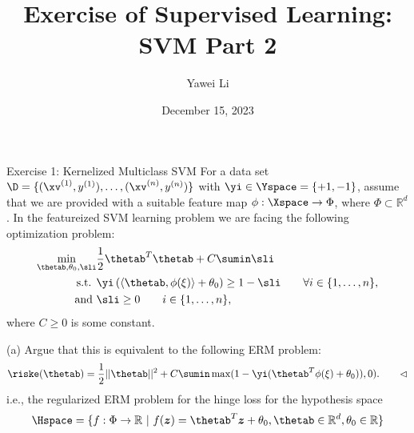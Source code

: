 \documentclass[aspectratio=169]{beamer}
\title[]{\textbf{Exercise of Supervised Learning: \\ SVM Part 2}}
\author{Yawei Li}
\institute[LMU]
{
\\
  \texttt{yawei.li@stat.uni-muenchen.de}
}
\date{December 15, 2023}
\newcommand{\zv}{\bm{z}}
\renewcommand{\phixi}{\phi(\xi)}
\begin{document}
\begin{frame}
\titlepage

\end{frame}

\begin{frame}{Exercise 1: Kernelized Multiclass SVM}
	\small
	For a data set $\D = \{(\xv^{(1)}, y^{(1)}), \ldots, (\xv^{(n)}, y^{(n)}) \}$ with $\yi \in \Yspace = \{+1, -1 \}$, assume that we are provided with a suitable feature map $\phi: \Xspace \to \Phi$, where $\Phi \subset \mathbb{R}^d$. In the featureized SVM learning problem we are facing the following optimization problem:
	\begin{align*}
		\min_{\thetab, \theta_0, \sli} &\frac{1}{2} \thetab^T \thetab + C \sumin \sli \\
		\text{s.t. } & \yi \left(\left\langle \thetab, \phixi \right\rangle  + \theta_0\right) \geq 1 - \sli \qquad \forall i \in \{1, \ldots, n \}, \\
		\text{and } & \sli \geq 0 \qquad i \in \{1, \ldots, n \},
	\end{align*}
	where $C \geq 0$ is some constant.
	
	(a) Argue that this is equivalent to the following ERM problem:
		\begin{align*}
			\riske(\thetab) = \frac{1}{2} ||\thetab||^2 + C\sumin \max(1 - \yi(\thetab^T \phixi + \theta_0)), 0). \qquad \lhd 
		\end{align*}
		i.e., the regularized ERM problem for the hinge loss for the hypothesis space 
		\begin{align*}
			\Hspace = \{f: \Phi \to \mathbb{R} \ | \ f(\zv) = \thetab^T \zv + \theta_0, \thetab \in \mathbb{R}^d, \theta_0 \in \mathbb{R} \}
		\end{align*}
\end{frame}
\end{document}
